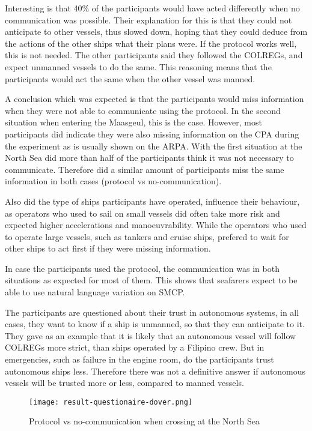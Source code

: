 Interesting is that 40\% of the participants would have acted differently when no communication was possible. Their explanation for this is that they could not anticipate to other vessels, thus slowed down, hoping that they could deduce from the actions of the other ships what their plans were. If the protocol works well, this is not needed. The other participants said they followed the \ac{COLREGs}, and expect unmanned vessels to do the same. This reasoning means that the participants would act the same when the other vessel was manned.

A conclusion which was expected is that the participants would miss information when they were not able to communicate using the protocol. In the second situation when entering the Maasgeul, this is the case. However, most participants did indicate they were also missing information on the \ac{CPA} during the experiment as is usually shown on the \ac{ARPA}. With the first situation at the North Sea did more than half of the participants think it was not necessary to communicate. Therefore did a similar amount of participants miss the same information in both cases (protocol vs no-communication).

Also did the type of ships participants have operated, influence their behaviour, as operators who used to sail on small vessels did often take more risk and expected higher accelerations and manoeuvrability. While the operators who used to operate large vessels, such as tankers and cruise ships, prefered to wait for other ships to act first if they were missing information.

In case the participants used the protocol, the communication was in both situations as expected for most of them. This shows that seafarers expect to be able to use natural language variation on \ac{SMCP}.

The participants are questioned about their trust in autonomous systems, in all cases, they want to know if a ship is unmanned, so that they can anticipate to it. They gave as an example that it is likely that an autonomous vessel will follow COLREGs more strict, than ships operated by a Filipino crew. But in emergencies, such as failure in the engine room, do the participants trust autonomous ships less. Therefore there was not a definitive answer if autonomous vessels will be trusted more or less, compared to manned vessels.

\begin{figure}[p]
	\centering
	\texttt{[image: result-questionaire-dover.png]}
	\caption{Protocol vs no-communication when crossing at the North Sea}
	\label{fig:sq-dover}
\end{figure}

